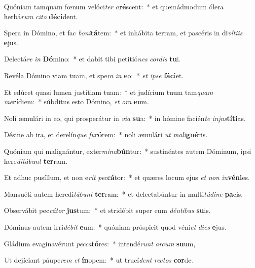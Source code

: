 \item Quóniam tamquam fœnum velóci\textit{ter} \textit{a}\textbf{ré}scent:~* et quemádmodum ólera herbá\textit{rum} \textit{ci}\textit{to} \textbf{dé}\textbf{ci}dent.
\item Spera in Dómino, et fac \textit{bo}\textit{ni}\textbf{tá}tem:~* et inhábita terram, et pascéris in di\textit{ví}\textit{ti}\textit{is} \textbf{e}jus.
\item Delectá\textit{re} \textit{in} \textbf{Dó}mino:~* et dabit tibi petitió\textit{nes} \textit{cor}\textit{dis} \textbf{tu}i.
\item Revéla Dómino viam tuam, et spe\textit{ra} \textit{in} \textbf{e}o:~* \textit{et} \textit{ip}\textit{se} \textbf{fá}\textbf{ci}et.
\item Et edúcet quasi lumen justítiam tuam:~† et judícium tuum tam\textit{quam} \textit{me}\textbf{rí}diem:~* súbditus esto Dómino, \textit{et} \textit{o}\textit{ra} \textbf{e}um.
\item Noli æmulári in eo, qui prosperátur in \textit{vi}\textit{a} \textbf{su}a:~* in hómine facién\textit{te} \textit{in}\textit{jus}\textbf{tí}\textbf{ti}as.
\item Désine ab ira, et derelín\textit{que} \textit{fu}\textbf{ró}rem:~* noli æmulári \textit{ut} \textit{ma}\textit{li}\textbf{gné}ris.
\item Quóniam qui malignántur, exter\textit{mi}\textit{na}\textbf{bún}tur:~* sustinéntes autem Dóminum, ipsi here\textit{di}\textit{tá}\textit{bunt} \textbf{ter}ram.
\item Et adhuc pusíllum, et non e\textit{rit} \textit{pec}\textbf{cá}tor:~* et quæres locum ejus \textit{et} \textit{non} \textit{in}\textbf{vé}\textbf{ni}es.
\item Mansuéti autem heredi\textit{tá}\textit{bunt} \textbf{ter}ram:~* et delectabúntur in multi\textit{tú}\textit{di}\textit{ne} \textbf{pa}cis.
\item Observábit pec\textit{cá}\textit{tor} \textbf{jus}tum:~* et stridébit super eum \textit{dén}\textit{ti}\textit{bus} \textbf{su}is.
\item Dóminus autem irri\textit{dé}\textit{bit} \textbf{e}um:~* quóniam próspicit quod véni\textit{et} \textit{di}\textit{es} \textbf{e}jus.
\item Gládium evaginavérunt \textit{pec}\textit{ca}\textbf{tó}res:~* intendé\textit{runt} \textit{ar}\textit{cum} \textbf{su}um,
\item Ut dejíciant páupe\textit{rem} \textit{et} \textbf{ín}opem:~* ut trucí\textit{dent} \textit{rec}\textit{tos} \textbf{cor}de.
